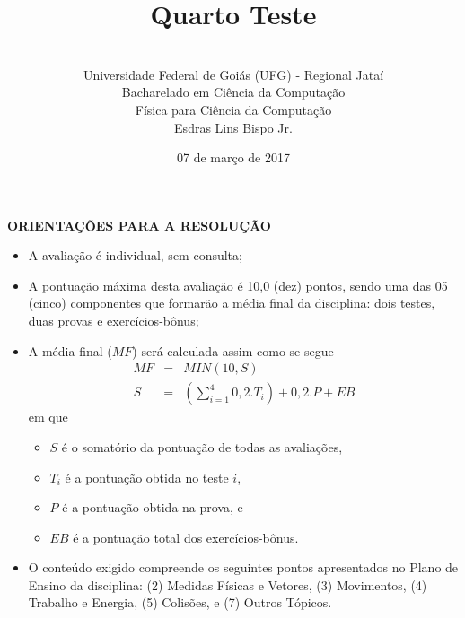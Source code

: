 \documentclass[12pt,a4paper,oneside]{article}
\author{\\Universidade Federal de Goiás (UFG) - Regional Jataí\\Bacharelado em Ciência da Computação \\Física para Ciência da Computação \\Esdras Lins Bispo Jr.}
\title{\sc \huge Quarto Teste}
\date{07 de março de 2017}
\begin{document}
\maketitle

{\bf ORIENTAÇÕES PARA A RESOLUÇÃO}

\footnotesize

\begin{itemize}
	\item A avaliação é individual, sem consulta;
	\item A pontuação máxima desta avaliação é 10,0 (dez) pontos, sendo uma das 05 (cinco) componentes que formarão a média final da disciplina: dois testes, duas provas e exercícios-bônus;
	\item A média final ($MF$) será calculada assim como se segue
	\begin{eqnarray}
		MF & = & MIN(10, S) \nonumber \\
		S & = & (\sum_{i=1}^{4} 0,2.T_i ) + 0,2.P  + EB \nonumber
	\end{eqnarray}
	em que 
	\begin{itemize}
		\item $S$ é o somatório da pontuação de todas as avaliações,
		\item $T_i$ é a pontuação obtida no teste $i$,
		\item $P$ é a pontuação obtida na prova, e
		\item $EB$ é a pontuação total dos exercícios-bônus.
	\end{itemize}
	\item O conteúdo exigido compreende os seguintes pontos apresentados no Plano de Ensino da disciplina: (2) Medidas Físicas e Vetores, (3) Movimentos, (4) Trabalho e Energia, (5) Colisões, e (7) Outros Tópicos.
\end{itemize}


\begin{center}
\end{center}

\newpage

\normalsize
\end{document}
